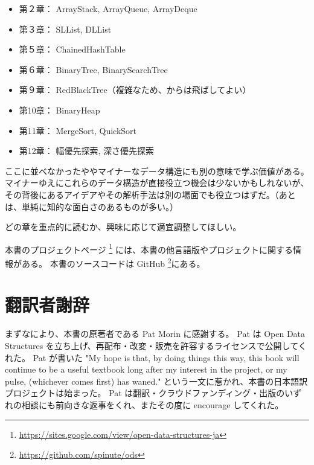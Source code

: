 \begin{itemize}
  \item 第２章： ArrayStack, ArrayQueue, ArrayDeque
  \item 第３章： SLList, DLList
  \item 第５章： ChainedHashTable
  \item 第６章： BinaryTree, BinarySearchTree
  \item 第９章： RedBlackTree（複雑なため、からは飛ばしてよい）
  \item 第10章： BinaryHeap
  \item 第11章： MergeSort, QuickSort
  \item 第12章： 幅優先探索, 深さ優先探索
\end{itemize}

ここに並べなかったややマイナーなデータ構造にも別の意味で学ぶ価値がある。
マイナーゆえにこれらのデータ構造が直接役立つ機会は少ないかもしれないが、その背後にあるアイデアやその解析手法は別の場面でも役立つはずだ。（あとは、単純に知的な面白さのあるものが多い。）

どの章を重点的に読むか、興味に応じて適宜調整してほしい。

本書のプロジェクトページ \footnote {\url{https://sites.google.com/view/open-data-structures-ja}} には、本書の他言語版やプロジェクトに関する情報がある。
本書のソースコードは GitHub \footnote {\url{https://github.com/spinute/ods}}にある。

\chapter*{翻訳者謝辞}

まずなにより、本書の原著者である Pat Morin に感謝する。
Pat は Open Data Structures を立ち上げ、再配布・改変・販売を許容するライセンスで公開してくれた。
Pat が書いた "My hope is that, by doing things this way, this book will continue to be a useful textbook long after my interest in the project, or my pulse, (whichever comes first) has waned." という一文に惹かれ、本書の日本語訳プロジェクトは始まった。
Pat は翻訳・クラウドファンディング・出版のいずれの相談にも前向きな返事をくれ、またその度に encourage してくれた。

